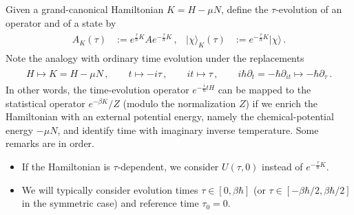 \documentclass[../QFT_main.tex]{subfiles}
\begin{document}
\begin{mytheorem}
Given a grand-canonical Hamiltonian $K=H-\mu N$, define the $\tau$-evolution of an operator and of a state by
{\small\begin{align}\begin{aligned}
    A_K(\tau)&:=e^{\tfrac{\tau}{\hbar}K}A e^{-\tfrac{\tau}{\hbar}K}\,,
    &
    |\chi\rangle_K(\tau)&:=e^{-\tfrac{\tau}{\hbar}K}|\chi\rangle\,.
\end{aligned}\end{align}}
Note the analogy with ordinary time evolution under the replacements
{\small\begin{align}\begin{aligned}
    H\longmapsto K=H-\mu N\,,
    \qquad
    t\longmapsto-i\tau\,,
    \qquad
    it\longmapsto\tau\,,
    \qquad
    i\hbar\partial_t=-\hbar\partial_{it}\longmapsto-\hbar\partial_\tau\,.
\end{aligned}\end{align}}
In other words, the time-evolution operator $e^{-\tfrac{i}{\hbar}tH}$ can be mapped to the statistical operator $e^{-\beta K}/Z$ (modulo the normalization $Z$) if we enrich the Hamiltonian with an external potential energy, namely the chemical-potential energy $-\mu N$, and identify time with imaginary inverse temperature.
Some remarks are in order.
\begin{itemize}
    \item If the Hamiltonian is $\tau$-dependent, we consider $U(\tau,0)$ instead of $e^{-\tfrac{\tau}{\hbar}K}$.
    \item We will typically consider evolution times $\tau\in[0,\beta\hbar]$ (or $\tau\in[-\beta\hbar/2,\beta\hbar/2]$ in the symmetric case) and reference time $\tau_0=0$.
\end{itemize}


\end{mytheorem}
\end{document}
